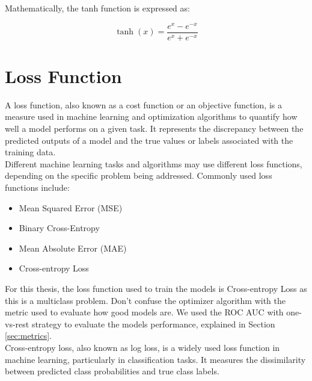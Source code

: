 \begin{itemize}
    \centering

    \raggedright
    Mathematically, the tanh function is expressed as:

    \[ \tanh(x) = \frac{{e^x - e^{-x}}}{{e^x + e^{-x}}} \]

\end{itemize}

\section{Loss Function}

A loss function, also known as a cost function or an objective function, is a
measure used in machine learning and optimization algorithms to quantify how
well a model performs on a given task. It represents the discrepancy between
the predicted outputs of a model and the true values or labels associated with
the training data. \\

Different machine learning tasks and algorithms may use different loss
functions, depending on the specific problem being addressed. Commonly used
loss functions include:

\begin{itemize}
  \item Mean Squared Error (MSE)
  \item Binary Cross-Entropy
  \item Mean Absolute Error (MAE)
  \item Cross-entropy Loss
\end{itemize}

For this thesis, the loss function used to train the models is
Cross-entropy Loss as this is a multiclass problem. Don't confuse the
optimizer algorithm with the metric used to evaluate how good models are. We
used the ROC AUC with one-vs-rest strategy to evaluate the models performance,
explained in Section \ref{sec:metrics}. \\

Cross-entropy loss, also known as log loss, is a widely used loss function in
machine learning, particularly in classification tasks. It measures the
dissimilarity between predicted class probabilities and true class labels.
\\


